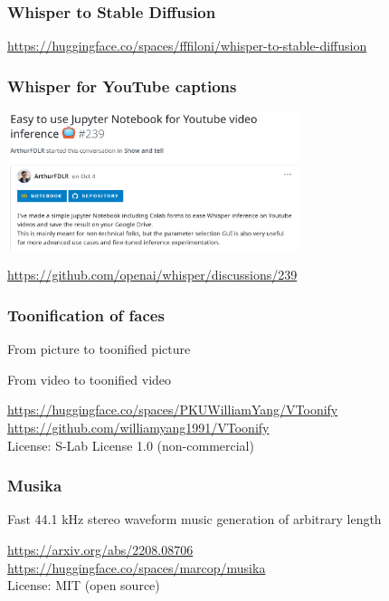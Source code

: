 \documentclass[17pt,aspectratio=169,hyperref={pdfusetitle,colorlinks,allcolors=olive}]{beamer}
\begin{document}
\begin{frame}[fragile]
  \frametitle{Whisper to Stable Diffusion}

  
  \begin{flushright}
    {\scriptsize
      \url{https://huggingface.co/spaces/fffiloni/whisper-to-stable-diffusion} \\
    }
  \end{flushright}

\end{frame}

\begin{frame}[fragile]
  \frametitle{Whisper for YouTube captions}

  \includegraphics[width=8.5cm]{figs/whisper-youtube}

  \begin{flushright}
    {\scriptsize
    \url{https://github.com/openai/whisper/discussions/239}
  }
  \end{flushright}

\end{frame}


\begin{frame}[fragile]
  \frametitle{Toonification of faces}

  From picture to toonified picture

  From video to toonified video
  
  \begin{flushright}
    \url{https://huggingface.co/spaces/PKUWilliamYang/VToonify} \\
    \url{https://github.com/williamyang1991/VToonify} \\
    License: S-Lab License 1.0 (non-commercial) \\
  \end{flushright}

\end{frame}

\begin{frame}[fragile]
  \frametitle{Musika}

  Fast 44.1 kHz stereo waveform music generation of arbitrary length

  \begin{flushright}
    \url{https://arxiv.org/abs/2208.08706} \\
    \url{https://huggingface.co/spaces/marcop/musika} \\
    License: MIT (open source) \\
  \end{flushright}

\end{frame}
\end{document}
